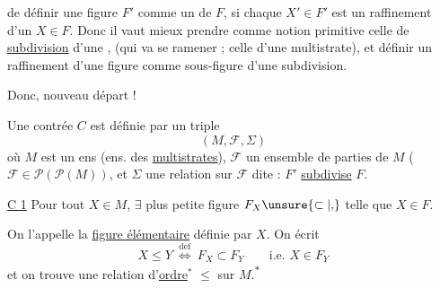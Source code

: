 de définir une figure $F'$ comme un \uline{} de $F$, si chaque $X'\in F'$  est un raffinement d'un $X\in F$. Donc il vaut mieux prendre comme notion primitive celle de \uline{subdivision} d'une  , (qui va se ramener ; celle d'une multistrate), et définir un raffinement d'une figure comme sous-figure d'une subdivision.

Donc, nouveau départ !

Une contrée $C$ est définie par un triple
\[
 (M,\mathcal F,\Sigma)
\]
où $ M$ est un ens (ens. des \uline{multistrates}), $\mathcal F$ un ensemble de parties de $ M$ ($\mathcal F\in\mathcal P(\mathcal P(M))$,  et $\Sigma$ une relation sur $\mathcal F$ dite : $F'$ \uline{subdivise} $F$. 

\uline{C 1} Pour tout $X\in M$, $\exists$  plus petite  figure  $F_X\unsure{\subset|{,}}$ telle que $X\in F$.

On l'appelle la \uline{figure élémentaire} définie par $X$. On écrit
\[
 X\leq Y\ \overset{\mathrm{def}}{\Longleftrightarrow}\ F_X\subset F_Y\qquad\text{i.e. }X\in F_Y
\]
et on trouve une relation d'\uline{ordre}$^{*}$ $\leq$ sur $ M$.\textsuperscript{$*$}
